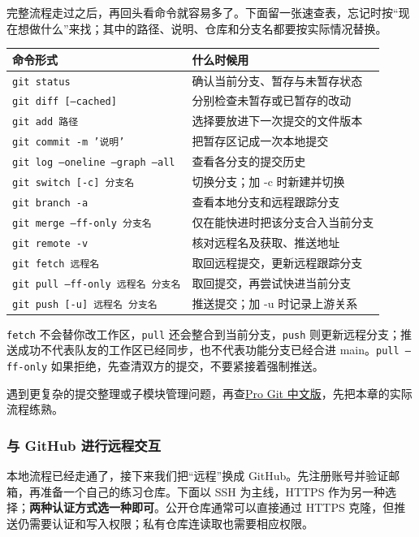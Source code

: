 完整流程走过之后，再回头看命令就容易多了。下面留一张速查表，忘记时按“现在想做什么”来找；其中的路径、说明、仓库和分支名都要按实际情况替换。
\begin{center}
\small
\begin{tabular}{>{\raggedright\arraybackslash}p{}>{\raggedright\arraybackslash}p{}}
\toprule
命令形式 & 什么时候用\\
\midrule
\texttt{git status} & 确认当前分支、暂存与未暂存状态\\
\texttt{git diff [--cached]} & 分别检查未暂存或已暂存的改动\\
\texttt{git add 路径} & 选择要放进下一次提交的文件版本\\
\texttt{git commit -m '说明'} & 把暂存区记成一次本地提交\\
\texttt{git log --oneline --graph --all} & 查看各分支的提交历史\\
\texttt{git switch [-c] 分支名} & 切换分支；加 -c 时新建并切换\\
\texttt{git branch -a} & 查看本地分支和远程跟踪分支\\
\texttt{git merge --ff-only 分支名} & 仅在能快进时把该分支合入当前分支\\
\texttt{git remote -v} & 核对远程名及获取、推送地址\\
\texttt{git fetch 远程名} & 取回远程提交，更新远程跟踪分支\\
\texttt{git pull --ff-only 远程名 分支名} & 取回提交，再尝试快进当前分支\\
\texttt{git push [-u] 远程名 分支名} & 推送提交；加 -u 时记录上游关系\\
\bottomrule
\end{tabular}
\end{center}
\texttt{fetch} 不会替你改工作区，\texttt{pull} 还会整合到当前分支，\texttt{push} 则更新远程分支；推送成功不代表队友的工作区已经同步，也不代表功能分支已经合进 main。\texttt{pull --ff-only} 如果拒绝，先查清双方的提交，不要紧接着强制推送。

\begin{note}
遇到更复杂的提交整理或子模块管理问题，再查\href{https://git-scm.com/book/zh/v2}{Pro Git 中文版}，先把本章的实际流程练熟。
\end{note}

\subsubsection{与 GitHub 进行远程交互}
\label{sec:git-github}
本地流程已经走通了，接下来我们把“远程”换成 GitHub。先注册账号并验证邮箱，再准备一个自己的练习仓库。下面以 SSH 为主线，HTTPS 作为另一种选择；\textbf{两种认证方式选一种即可}。公开仓库通常可以直接通过 HTTPS 克隆，但推送仍需要认证和写入权限；私有仓库连读取也需要相应权限。

